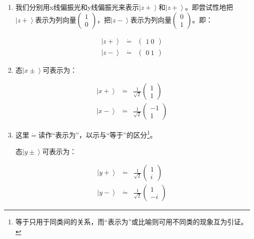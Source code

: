 \begin{enumerate}
\item 

我们分别用x线偏振光和y线偏振光来表示$\left| z+ \right\rangle$和$\left| z+ \right\rangle$。即尝试性地把$\left| z+ \right\rangle$表示为列向量$\left( \begin{array}{ccc} 1 \\ 0   \end{array} \right)$，把$\left| z- \right\rangle$表示为列向量$\left( \begin{array}{ccc} 0 \\ 1 \end{array} \right)$。即：

\begin{align}
\left| z+ \right\rangle & \dot = & \left( \begin{array}{ccc} 1 \ 0   \end{array} \right)~\\
\left| z- \right\rangle & \dot = & \left( \begin{array}{ccc} 0 \ 1 \end{array} \right)~
\end{align}

\item

态$\left| x \pm \right\rangle$可表示为：

\begin{align}
\left| x + \right\rangle & \dot = & \frac{1}{\sqrt{2}}  \left( \begin{array}{ccc}  1 \\ 1 \end{array}  \right)~ \\
\left| x - \right\rangle  & \dot =  & \frac{1}{\sqrt{2}}  \left( \begin{array}{ccc}  -1 \\ 1 \end{array} \right)~
\end{align}

\item
这里$\dot =$读作“表示为”，以示与“等于”的区分\footnote{等于只用于同类间的关系，而“表示为”或比喻则可用不同类的现象互为引证。}。

态$\left| y \pm \right\rangle$可表示为：

\begin{align}
\left| y + \right\rangle & \dot = & \frac{1}{\sqrt{2}} \left( \begin{array}{ccc}  1 \\ i  \end{array} \right)~ \\
\left| y - \right\rangle  & \dot =  & \frac{1}{\sqrt{2}} \left( \begin{array}{ccc}  1 \\ -i \end{array} \right)~
\end{align}

\end{enumerate}
